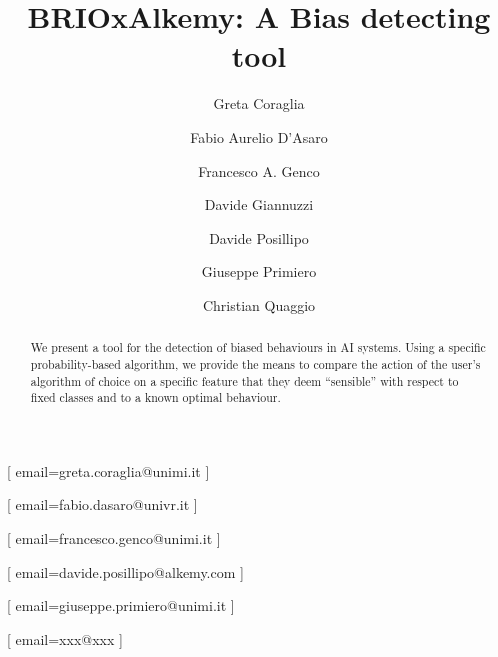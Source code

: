 \documentclass[
]{ceurart}
\begin{document}


\title{BRIOxAlkemy: A Bias detecting tool}

\tnotemark[1]


\author[1]{Greta Coraglia}[
email=greta.coraglia@unimi.it
]
\author[3]{Fabio Aurelio D'Asaro}[
email=fabio.dasaro@univr.it
]
\author[1]{Francesco A. Genco}[%
email=francesco.genco@unimi.it
]
\author[2]{Davide Giannuzzi}
\author[2]{Davide Posillipo}[
email=davide.posillipo@alkemy.com
]
\author[1]{Giuseppe Primiero}[
email=giuseppe.primiero@unimi.it
]
\author[2]{Christian Quaggio}[
email=xxx@xxx
]


\address[1]{LUCI Group, University of Milan, via Festa del Perdono 7, 20122 Milan, Italy}
\address[2]{Alkemy, \dots}
\address[3]{Verona}



\begin{abstract}
We present a tool for the detection of biased behaviours in AI systems. Using a specific probability-based algorithm,
we provide the means to compare the action of the user's algorithm of choice on a specific feature that they deem ``sensible'' with respect to fixed classes and to a known optimal behaviour.
\end{abstract}
\end{document}
